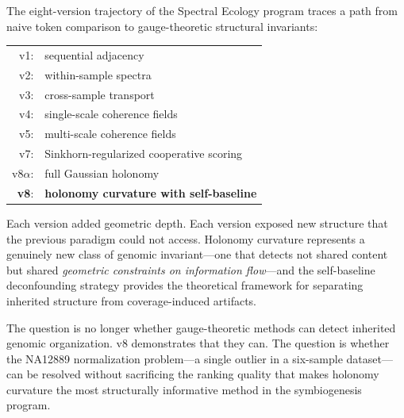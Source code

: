 \documentclass{../yalumba}
\begin{document}
The eight-version trajectory of the Spectral Ecology program traces a path
from naive token comparison to gauge-theoretic structural invariants:

\begin{center}
\begin{tabular}{rl}
  v1: & sequential adjacency \\
  v2: & within-sample spectra \\
  v3: & cross-sample transport \\
  v4: & single-scale coherence fields \\
  v5: & multi-scale coherence fields \\
  v7: & Sinkhorn-regularized cooperative scoring \\
  v8$\alpha$: & full Gaussian holonomy \\
  \textbf{v8}: & \textbf{holonomy curvature with self-baseline} \\
\end{tabular}
\end{center}

Each version added geometric depth.  Each version exposed new structure
that the previous paradigm could not access.  Holonomy curvature represents
a genuinely new class of genomic invariant---one that detects not shared
content but shared \emph{geometric constraints on information flow}---and
the self-baseline deconfounding strategy provides the theoretical framework
for separating inherited structure from coverage-induced artifacts.

The question is no longer whether gauge-theoretic methods can detect
inherited genomic organization.  v8 demonstrates that they can.  The
question is whether the NA12889 normalization problem---a single outlier in
a six-sample dataset---can be resolved without sacrificing the ranking
quality that makes holonomy curvature the most structurally informative
method in the symbiogenesis program.




\end{document}
